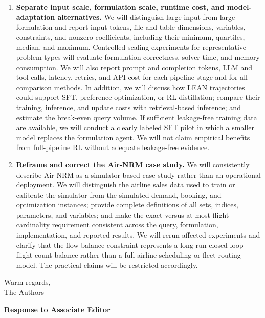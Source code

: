 \documentclass[11pt]{article}
\begin{document}
\begin{enumerate}
    \item \textbf{Separate input scale, formulation scale, runtime cost, and
    model-adaptation alternatives.}
    We will distinguish large input from large formulation and report input
    tokens, file and table dimensions, variables, constraints, and nonzero
    coefficients, including their minimum, quartiles, median, and maximum.
    Controlled scaling experiments for representative problem types will
    evaluate formulation correctness, solver time, and memory consumption. We
    will also report prompt and completion tokens, LLM and tool calls, latency,
    retries, and API cost for each pipeline stage and for all comparison
    methods. In addition, we will discuss how LEAN trajectories could support
    SFT, preference optimization, or RL distillation; compare their training,
    inference, and update costs with retrieval-based inference; and estimate
    the break-even query volume. If sufficient leakage-free training data are
    available, we will conduct a clearly labeled SFT pilot in which a smaller
    model replaces the formulation agent. We will not claim empirical benefits
    from full-pipeline RL without adequate leakage-free evidence.

    \item \textbf{Reframe and correct the Air-NRM case study.}
    We will consistently describe Air-NRM as a simulator-based case study
    rather than an operational deployment. We will distinguish the airline
    sales data used to train or calibrate the simulator from the simulated
    demand, booking, and optimization instances; provide complete definitions
    of all sets, indices, parameters, and variables; and make the
    exact-versus-at-most flight-cardinality requirement consistent across the
    query, formulation, implementation, and reported results. We will rerun
    affected experiments and clarify that the flow-balance constraint
    represents a long-run closed-loop flight-count balance rather than a full
    airline scheduling or fleet-routing model. The practical claims will be
    restricted accordingly.
\end{enumerate}


\begin{flushleft}
Warm regards,\\
The Authors
\end{flushleft}

\newpage
\begin{center}
{\LARGE\textbf{Response to Associate Editor}}
\end{center}
\end{document}
